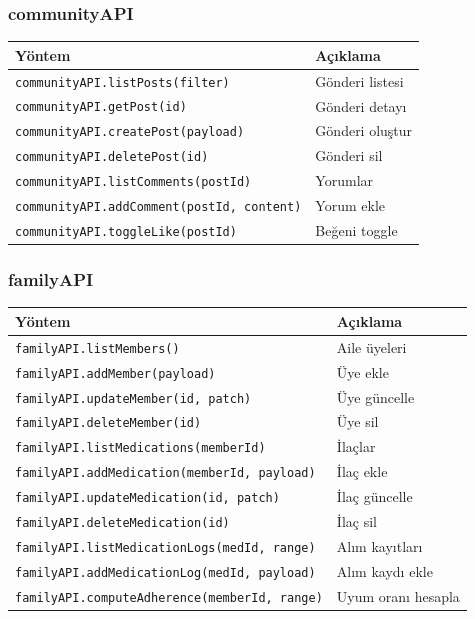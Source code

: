 \subsubsection{communityAPI}

\begin{table}[H]
\centering
\small
\begin{tabular}{|l|p{}|}
\hline
\textbf{Yöntem} & \textbf{Açıklama} \\
\hline
\texttt{communityAPI.listPosts(filter)}                 & Gönderi listesi \\
\texttt{communityAPI.getPost(id)}                       & Gönderi detayı \\
\texttt{communityAPI.createPost(payload)}               & Gönderi oluştur \\
\texttt{communityAPI.deletePost(id)}                    & Gönderi sil \\
\texttt{communityAPI.listComments(postId)}              & Yorumlar \\
\texttt{communityAPI.addComment(postId, content)}       & Yorum ekle \\
\texttt{communityAPI.toggleLike(postId)}                & Beğeni toggle \\
\hline
\end{tabular}
\end{table}

\subsubsection{familyAPI}

\begin{table}[H]
\centering
\small
\begin{tabular}{|l|p{}|}
\hline
\textbf{Yöntem} & \textbf{Açıklama} \\
\hline
\texttt{familyAPI.listMembers()}                          & Aile üyeleri \\
\texttt{familyAPI.addMember(payload)}                     & Üye ekle \\
\texttt{familyAPI.updateMember(id, patch)}                & Üye güncelle \\
\texttt{familyAPI.deleteMember(id)}                       & Üye sil \\
\texttt{familyAPI.listMedications(memberId)}              & İlaçlar \\
\texttt{familyAPI.addMedication(memberId, payload)}       & İlaç ekle \\
\texttt{familyAPI.updateMedication(id, patch)}            & İlaç güncelle \\
\texttt{familyAPI.deleteMedication(id)}                   & İlaç sil \\
\texttt{familyAPI.listMedicationLogs(medId, range)}       & Alım kayıtları \\
\texttt{familyAPI.addMedicationLog(medId, payload)}       & Alım kaydı ekle \\
\texttt{familyAPI.computeAdherence(memberId, range)}      & Uyum oranı hesapla \\
\hline
\end{tabular}
\end{table}

